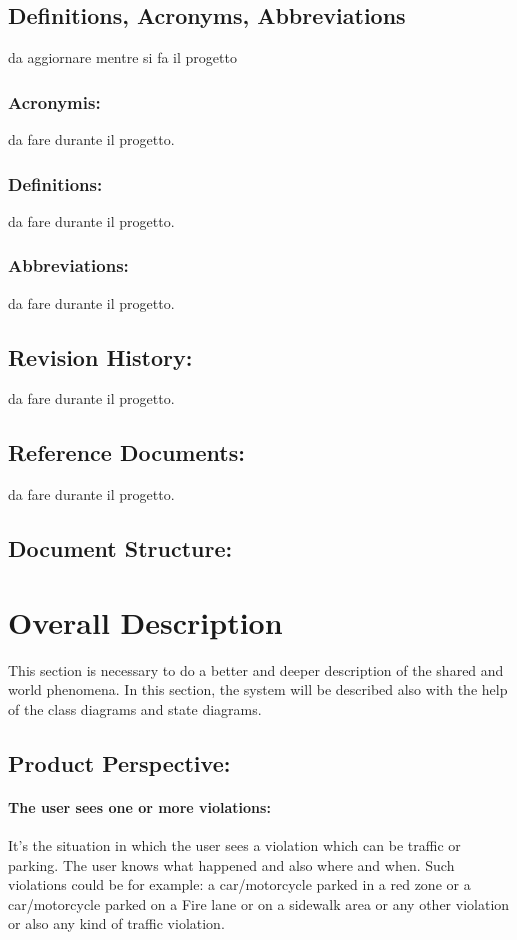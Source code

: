 \documentclass[titlepage]{article}
\begin{document}
\subsection{Deﬁnitions, Acronyms, Abbreviations}
da aggiornare mentre si fa il progetto
\subsubsection{Acronymis:}
da fare durante il progetto.
\subsubsection{Definitions:}
da fare durante il progetto.
\subsubsection{Abbreviations:}
da fare durante il progetto.
\subsection{Revision History: }
da fare durante il progetto.
\subsection{Reference Documents:}
da fare durante il progetto.
\subsection{Document Structure: }
\newpage

\section{Overall Description}
This section is necessary to do a better and deeper description of the shared and world phenomena. In this section, the system will be described also with the help of the class diagrams and state diagrams.
\subsection{Product Perspective:}
\paragraph{The user sees one or more violations:}
It's the situation in which the user sees a violation which can be traffic or parking. The user knows what happened and also where and when. Such violations could be for example: a car/motorcycle parked in a red zone or a car/motorcycle parked on a Fire lane or on a sidewalk area or any other violation or also any kind of traffic violation.
\end{document}
